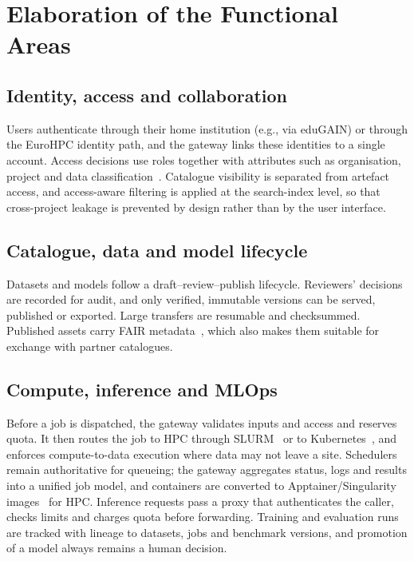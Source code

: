 \documentclass[conference,a4paper]{IEEEtran}
\begin{document}
\section{Elaboration of the Functional Areas}

\subsection{Identity, access and collaboration}
Users authenticate through their home institution (e.g., via eduGAIN) or through the EuroHPC identity path, and the gateway links these identities to a single account. Access decisions use roles together with attributes such as organisation, project and data classification~\cite{nist_abac}. Catalogue visibility is separated from artefact access, and access-aware filtering is applied at the search-index level, so that cross-project leakage is prevented by design rather than by the user interface.

\subsection{Catalogue, data and model lifecycle}
Datasets and models follow a draft--review--publish lifecycle. Reviewers' decisions are recorded for audit, and only verified, immutable versions can be served, published or exported. Large transfers are resumable and checksummed. Published assets carry FAIR metadata~\cite{wilkinson2016fair}, which also makes them suitable for exchange with partner catalogues.

\subsection{Compute, inference and MLOps}
Before a job is dispatched, the gateway validates inputs and access and reserves quota. It then routes the job to HPC through SLURM~\cite{yoo2003slurm} or to Kubernetes~\cite{burns2016borg}, and enforces compute-to-data execution where data may not leave a site. Schedulers remain authoritative for queueing; the gateway aggregates status, logs and results into a unified job model, and containers are converted to Apptainer/Singularity images~\cite{kurtzer2017singularity} for HPC. Inference requests pass a proxy that authenticates the caller, checks limits and charges quota before forwarding. Training and evaluation runs are tracked with lineage to datasets, jobs and benchmark versions, and promotion of a model always remains a human decision.
\end{document}
